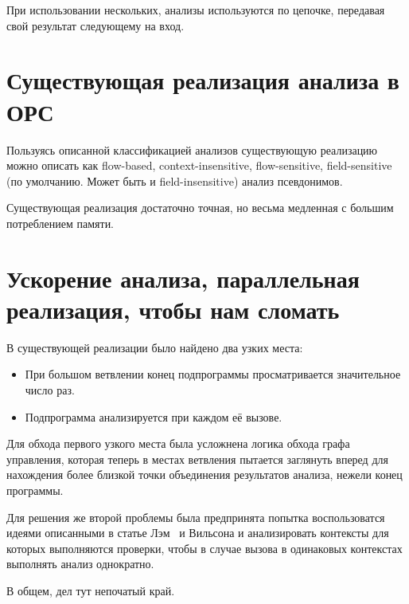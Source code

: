 При использовании нескольких, анализы используются по цепочке, передавая свой результат следующему на вход.

\section{Существующая реализация анализа в ОРС}

Пользуясь описанной классификацией анализов существующую реализацию можно описать как flow-based, context-insensitive, flow-sensitive, field-sensitive (по умолчанию. Может быть и field-insensitive) анализ псевдонимов.

Существующая реализация достаточно точная, но весьма медленная с большим потреблением памяти.

\section{Ускорение анализа, параллельная реализация, чтобы нам сломать}

В существующей реализации было найдено два узких места:

\begin{itemize}
\item При большом ветвлении конец подпрограммы просматривается значительное число раз.
\item Подпрограмма анализируется при каждом её вызове.
\end{itemize}

Для обхода первого узкого места была усложнена логика обхода графа управления, которая теперь в местах ветвления пытается заглянуть вперед для нахождения более близкой точки объединения результатов анализа, нежели конец программы.

Для решения же второй проблемы была предпринята попытка воспользоватся идеями описанными в статье Лэм~\autocite{HeineLamPLDI03} и Вильсона и анализировать контексты для которых выполняются проверки, чтобы в случае вызова в одинаковых контекстах выполнять анализ однократно.

\Conc

В общем, дел тут непочатый край.

\printbibliography[
    heading=bibintoc%
    ,title=Библиография %
]


